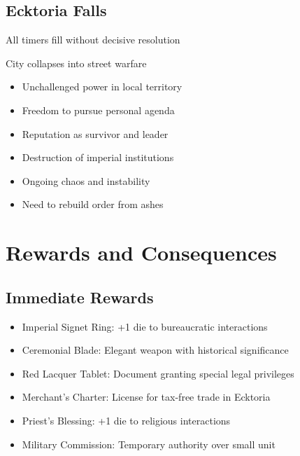 \documentclass[11pt]{article}
\newenvironment{ending}[1]{\begin{description}[leftmargin=*,style=standard]\item[\textbf{#1}]}{\end{description}}
\begin{document}
\subsection{Ecktoria Falls}
\begin{ending}{Ecktoria Falls}
\item[Conditions:] All timers fill without decisive resolution
\item[Outcome:] City collapses into street warfare
\item[Rewards:] 
  \begin{itemize}
    \item Unchallenged power in local territory
    \item Freedom to pursue personal agenda
    \item Reputation as survivor and leader
  \end{itemize}
\item[Consequences:] 
  \begin{itemize}
    \item Destruction of imperial institutions
    \item Ongoing chaos and instability
    \item Need to rebuild order from ashes
  \end{itemize}
\end{ending}

\section{Rewards and Consequences}

\subsection{Immediate Rewards}
\begin{itemize}
\item Imperial Signet Ring: +1 die to bureaucratic interactions
\item Ceremonial Blade: Elegant weapon with historical significance
\item Red Lacquer Tablet: Document granting special legal privileges
\item Merchant's Charter: License for tax-free trade in Ecktoria
\item Priest's Blessing: +1 die to religious interactions
\item Military Commission: Temporary authority over small unit
\end{itemize}
\end{document}
